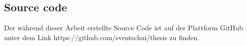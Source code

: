 \subsection{Source code}

Der während dieser Arbeit erstellte Source Code ist auf der Plattform GitHub unter dem Link https://github.com/sventschui/thesis zu finden.
